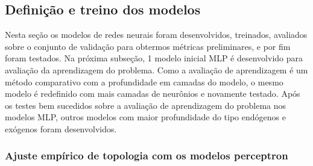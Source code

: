 \documentclass[	12pt, Times, openright, twoside, a4paper, english, brazil]{abntex2}
\begin{document}
                
    	\subsection{Definição e treino dos modelos}
    	    Nesta seção os modelos de redes neurais foram desenvolvidos, treinados, avaliados sobre o conjunto de validação para obtermos métricas preliminares, e por fim foram testados.
    	    Na próxima subseção, 1 modelo inicial MLP é desenvolvido para avaliação da aprendizagem do problema.
    	    Como a avaliação de aprendizagem é um método comparativo com a profundidade em camadas do modelo, o mesmo modelo é redefinido com mais camadas de neurônios e novamente testado.
    	    Após os testes bem sucedidos sobre a avaliação de aprendizagem do problema nos modelos MLP, outros modelos com maior profundidade do tipo endógenos e exógenos foram desenvolvidos.
    	    \subsubsection{Ajuste empírico de topologia com os modelos perceptron}
\end{document}
